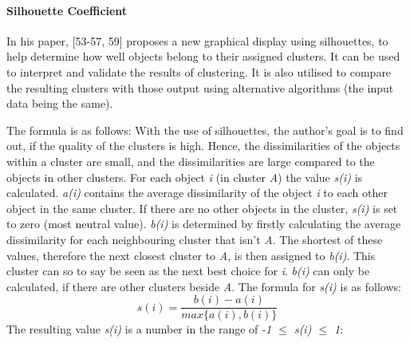   
  \paragraph{Silhouette Coefficient}
  \label{section:silhouetteCoefficient}
  In his paper, \textcite{rousseeuw1987silhouettes}[53-57, 59] proposes a new graphical display using silhouettes, to help determine how well objects belong to their assigned clusters. It can be used to interpret and validate the results of clustering. It is also utilised to compare the resulting clusters with those output using alternative algorithms (the input data being the same). 
  

  The formula is as follows:
  With the use of silhouettes, the author's goal is to find out, if the quality of the clusters is high. Hence, the dissimilarities of the objects within a cluster are small, and the dissimilarities are large compared to the objects in other clusters. For each object \textit{i} (in cluster \textit{A}) the value \textit{s(i)} is calculated. \textit{a(i)} contains the average dissimilarity of the object \textit{i} to each other object in the same cluster. If there are no other objects in the cluster, \textit{s(i)} is set to zero (most neutral value). \textit{b(i)} is determined by firstly calculating the average dissimilarity for each neighbouring cluster that isn't \textit{A}. The shortest of these values, therefore the next closest cluster to \textit{A}, is then assigned to \textit{b(i)}. This cluster can so to say be seen as the next best choice for \textit{i}. \textit{b(i)} can only be calculated, if there are other clusters beside \textit{A}. The formula for \textit{s(i)} is as follows:
  \[
    s(i) = \frac{b(i) - a(i)}{max\{a(i), b(i)\}}  
  \]
  The resulting value \textit{s(i)} is a number in the range of \textit{-1 $\leq$ \textit{s(i)} $\leq$ 1}:

